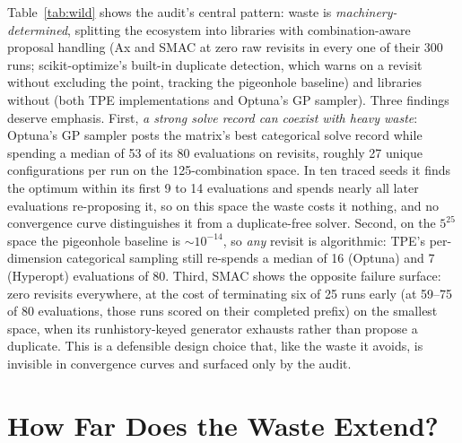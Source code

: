 \documentclass[%
 aip,
 amsmath,amssymb,
 floatfix,
 reprint,%
]{revtex4-1}
\begin{document}
Table~\ref{tab:wild} shows the audit's central pattern: waste is
\emph{machinery-determined}, splitting the ecosystem into libraries with
combination-aware proposal handling (Ax and SMAC at zero raw revisits in
every one of their 300 runs; scikit-optimize's built-in duplicate
detection, which warns on a revisit without excluding the point,
tracking the pigeonhole baseline) and libraries without (both
TPE implementations and Optuna's GP sampler). Three findings deserve
emphasis. First, \emph{a strong solve record can coexist with heavy
waste}: Optuna's GP sampler posts the matrix's best categorical solve
record while spending a median of 53 of its 80 evaluations on revisits,
roughly 27 unique configurations per run on the 125-combination space. In
ten traced seeds it finds the optimum within its first 9 to 14
evaluations and spends nearly all later evaluations re-proposing it, so
on this space the waste costs it nothing, and no convergence curve
distinguishes it from a duplicate-free solver. Second, on the $5^{25}$
space the pigeonhole baseline is ${\sim}10^{-14}$, so \emph{any} revisit
is algorithmic: TPE's per-dimension categorical sampling still re-spends
a median of 16 (Optuna) and 7 (Hyperopt) evaluations of 80. Third, SMAC
shows the opposite failure surface: zero revisits everywhere, at the cost
of terminating six of 25 runs early (at 59--75 of 80 evaluations, those
runs scored on their completed prefix) on the
smallest space, when its runhistory-keyed generator exhausts rather than
propose a duplicate. This is a defensible design choice that, like the
waste it avoids, is invisible in convergence curves and surfaced only by
the audit.
\section{How Far Does the Waste Extend?}
\label{sec:sweep}
\end{document}
